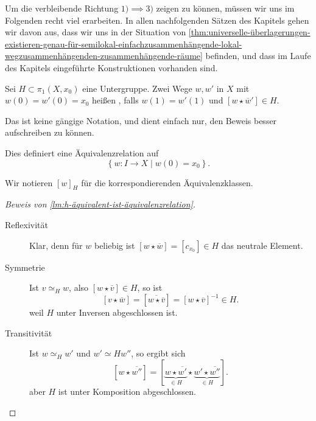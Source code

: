 
Um die verbleibende Richtung $1)\implies 3)$ zeigen zu können, müssen wir uns im Folgenden recht viel erarbeiten. In allen nachfolgenden Sätzen des Kapitels gehen wir davon aus, dass wir uns in der Situation von \autoref{thm:universelle-überlagerungen-existieren-genau-für-semilokal-einfachzusammenhängende-lokal-wegzusammenhängenden-zusammenhängende-räume} befinden, und dass im Laufe des Kapitels eingeführte Konstruktionen vorhanden sind.

\begin{definition*}\label{def:h-äquivalent-für-untegruppen}
    Sei $H\subset \pi_1(X,x_0)$ eine Untergruppe. Zwei Wege $w,w'$ in  $X$ mit  $w(0) = w'(0) = x_0$ heißen , falls $w(1) = w'(1)$ und  $[w \star \overline{w}']\in H$. 
\end{definition*}

\begin{oral}
Das ist keine gängige Notation, und dient einfach nur, den Beweis besser aufschreiben zu können.    
\end{oral}

\begin{lemma}\label{lm:h-äquivalent-ist-äquivalenzrelation}
    Dies definiert eine Äquivalenzrelation auf
    \[
        \left \{w\colon  I \to  X \mid w(0) = x_0\right\} 
    .\] 
\end{lemma}

\begin{notation*}
    Wir notieren $[w]_H$ für die korrespondierenden Äquivalenzklassen.
\end{notation*}

\begin{proof}[Beweis von \autoref{lm:h-äquivalent-ist-äquivalenzrelation}]
    \begin{description}
        \item[Reflexivität] Klar, denn für $w$ beliebig ist  $[w \star \overline{w}] = [c_{x_0}]\in H$ das neutrale Element.
        \item[Symmetrie] Ist $v \simeq_H w$, also  $[w \star \overline{v}] \in H$, so ist
            \[
                [v \star \overline{w}] = [\overline{w \star \overline{v}}] = [ w \star \overline{v}]^{-1} \in H
            .\] 
            weil $H$ unter Inversen abgeschlossen ist.
        \item[Transitivität] Ist $w \simeq_H w'$ und  $w' \simeq H w''$, so ergibt sich
    \[
        [w \star \overline{w''}] =         [\underbrace{w \star \overline{w'}}_{\in H} \star \underbrace{w' \star \overline{w''}}_{\in H}]
    .\] 
aber $H$ ist unter Komposition abgeschlossen.
    \end{description}
\end{proof}

